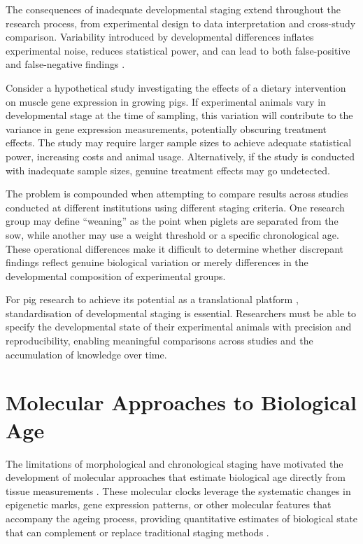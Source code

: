 The consequences of inadequate developmental staging extend throughout the research process, from experimental design to data interpretation and cross-study comparison. Variability introduced by developmental differences inflates experimental noise, reduces statistical power, and can lead to both false-positive and false-negative findings \parencite{baker_1500_2016}.

Consider a hypothetical study investigating the effects of a dietary intervention on muscle gene expression in growing pigs. If experimental animals vary in developmental stage at the time of sampling, this variation will contribute to the variance in gene expression measurements, potentially obscuring treatment effects. The study may require larger sample sizes to achieve adequate statistical power, increasing costs and animal usage. Alternatively, if the study is conducted with inadequate sample sizes, genuine treatment effects may go undetected.

The problem is compounded when attempting to compare results across studies conducted at different institutions using different staging criteria. One research group may define ``weaning'' as the point when piglets are separated from the sow, while another may use a weight threshold or a specific chronological age. These operational differences make it difficult to determine whether discrepant findings reflect genuine biological variation or merely differences in the developmental composition of experimental groups.

For pig research to achieve its potential as a translational platform \parencite{lunney_importance_2021, swindle_swine_2012}, standardisation of developmental staging is essential. Researchers must be able to specify the developmental state of their experimental animals with precision and reproducibility, enabling meaningful comparisons across studies and the accumulation of knowledge over time.


\section{Molecular Approaches to Biological Age}\label{sec:intro:molecular}

The limitations of morphological and chronological staging have motivated the development of molecular approaches that estimate biological age directly from tissue measurements \parencite{horvath_dna_2013, hannum_genome-wide_2013, duan_epigenetic_2022}. These molecular clocks leverage the systematic changes in epigenetic marks, gene expression patterns, or other molecular features that accompany the ageing process, providing quantitative estimates of biological state that can complement or replace traditional staging methods \parencite{bi_ageing_clock_team_multi-tissue_2017, muralidharan_human_2025, sun_spatial_2025}.

